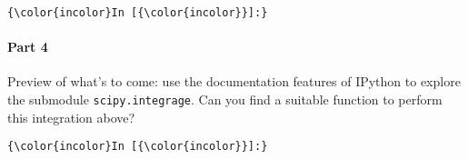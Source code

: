 \documentclass{article}
\begin{document}
    \begin{Verbatim}[commandchars=\\\{\}]
{\color{incolor}In [{\color{incolor}}]:} 
\end{Verbatim}

    \paragraph{Part 4}

Preview of what's to come: use the documentation features of IPython to
explore the submodule \texttt{scipy.integrage}. Can you find a suitable
function to perform this integration above?

    \begin{Verbatim}[commandchars=\\\{\}]
{\color{incolor}In [{\color{incolor}}]:} 
\end{Verbatim}


    
    
    
    
\end{document}
